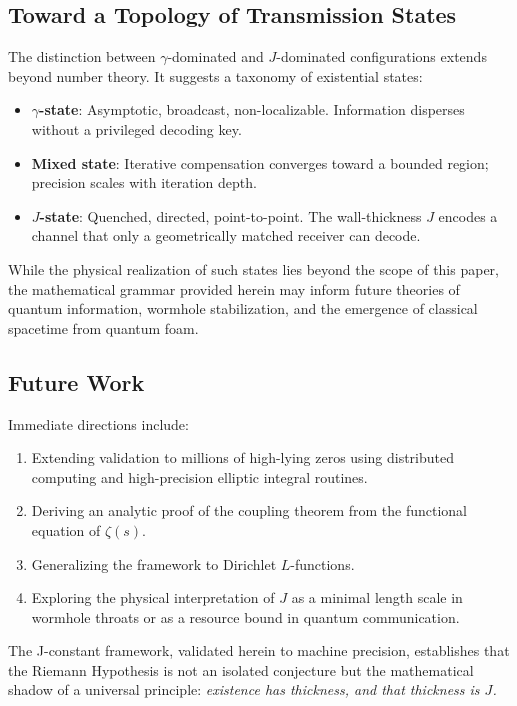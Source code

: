 \documentclass[11pt,a4paper]{article}
\theoremstyle{definition}
\begin{document}
\subsection{Toward a Topology of Transmission States}
The distinction between \(\gamma\)-dominated and \(J\)-dominated configurations extends beyond number theory. 
It suggests a taxonomy of existential states:
\begin{itemize}[leftmargin=2em]
    \item \textbf{\(\gamma\)-state}: Asymptotic, broadcast, non-localizable. Information disperses without a privileged decoding key.
    \item \textbf{Mixed state}: Iterative compensation converges toward a bounded region; precision scales with iteration depth.
    \item \textbf{\(J\)-state}: Quenched, directed, point-to-point. The wall-thickness \(J\) encodes a channel that only a geometrically matched receiver can decode.
\end{itemize}
While the physical realization of such states lies beyond the scope of this paper, the mathematical grammar provided herein may inform future theories of quantum information, wormhole stabilization, and the emergence of classical spacetime from quantum foam.

\subsection{Future Work}
Immediate directions include:
\begin{enumerate}[leftmargin=2em]
    \item Extending validation to millions of high-lying zeros using distributed computing and high-precision elliptic integral routines.
    \item Deriving an analytic proof of the coupling theorem from the functional equation of \(\zeta(s)\).
    \item Generalizing the framework to Dirichlet \(L\)-functions.
    \item Exploring the physical interpretation of \(J\) as a minimal length scale in wormhole throats or as a resource bound in quantum communication.
\end{enumerate}
The J-constant framework, validated herein to machine precision, establishes that the Riemann Hypothesis is not an isolated conjecture but the mathematical shadow of a universal principle: \emph{existence has thickness, and that thickness is \(J\).}
\end{document}

